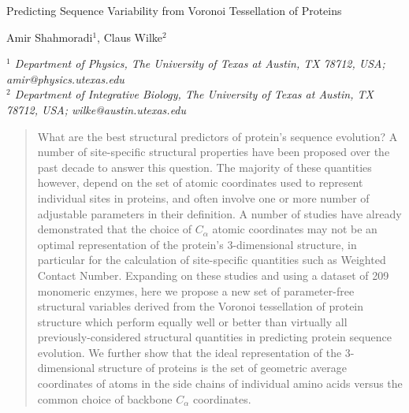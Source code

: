 \documentclass[11pt]{article}
\makeatletter
\newcommand\pubnumber{}
\newcommand\pubdate{\today}
\def\affiliation{$^1$ Department of Physics, The University of Texas at Austin, TX 78712, USA; amir@physics.utexas.edu \\
                 $^2$ Department of Integrative Biology, The University of Texas at Austin, TX 78712, USA; wilke@austin.utexas.edu
                 }
\def\Title#1{\begin{center} {\Large #1 } \end{center}}
\def\Author#1{\begin{center}{ \sc #1} \end{center}}
\def\Address#1{\begin{center}{ \it #1} \end{center}}
\newcommand\pubblock{\rightline{\begin{tabular}{l} \pubnumber\\
         \pubdate  \end{tabular}}}
\newenvironment{Abstract}{\begin{quotation}  }{\end{quotation}}
\makeatother
\begin{document}
\begin{titlepage}
\pubblock

\vfill
\Title{Predicting Sequence Variability from Voronoi Tessellation of Proteins}
\vfill
\Author{Amir Shahmoradi$^{1}$, Claus Wilke$^2$}
\Address{\affiliation}
\vfill
\begin{Abstract}
    What are the best structural predictors of protein's sequence evolution? A number of site-specific structural properties have been proposed over the past decade to answer this question. The majority of these quantities however, depend on the set of atomic coordinates used to represent individual sites in proteins, and often involve one or more number of adjustable parameters in their definition. A number of studies have already demonstrated that the choice of $C_\alpha$ atomic coordinates may not be an optimal representation of the protein's 3-dimensional structure, in particular for the calculation of site-specific quantities such as Weighted Contact Number.  Expanding on these studies and using a dataset of 209 monomeric enzymes, here we propose a new set of parameter-free structural variables derived from the Voronoi tessellation of protein structure which perform equally well or better than virtually all previously-considered structural quantities in predicting protein sequence evolution. We further show that the ideal representation of the 3-dimensional structure of proteins is the set of geometric average coordinates of atoms in the side chains of individual amino acids versus the common choice of backbone $C_\alpha$ coordinates.

\end{Abstract}
\end{titlepage}
\end{document}
